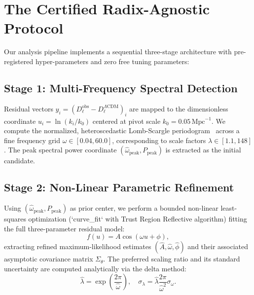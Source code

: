 \section{The Certified Radix-Agnostic Protocol}
Our analysis pipeline implements a sequential three-stage architecture with pre-registered hyper-parameters and zero free tuning parameters:

\subsection{Stage 1: Multi-Frequency Spectral Detection}
Residual vectors $y_i = (D_\ell^{\mathrm{obs}} - D_\ell^{\Lambda\mathrm{CDM}})_i$ are mapped to the dimensionless coordinate $u_i = \ln(k_i / k_0)$ centered at pivot scale $k_0 = 0.05\,\mathrm{Mpc}^{-1}$. We compute the normalized, heteroscedastic Lomb-Scargle periodogram~\cite{lomb1976,scargle1982,zechmeister2009} across a fine frequency grid $\omega \in [0.04, 60.0]$, corresponding to scale factors $\lambda \in [1.1, 148]$. The peak spectral power coordinate $(\hat\omega_{\mathrm{peak}}, P_{\mathrm{peak}})$ is extracted as the initial candidate.

\subsection{Stage 2: Non-Linear Parametric Refinement}
Using $(\hat\omega_{\mathrm{peak}}, P_{\mathrm{peak}})$ as prior center, we perform a bounded non-linear least-squares optimization (`curve\_fit` with Trust Region Reflective algorithm) fitting the full three-parameter residual model:
\begin{equation}
f(u) = A \cos(\omega u + \phi),
\end{equation}
extracting refined maximum-likelihood estimates $(\hat A, \hat\omega, \hat\phi)$ and their associated asymptotic covariance matrix $\Sigma_{\theta}$. The preferred scaling ratio and its standard uncertainty are computed analytically via the delta method:
\begin{equation}
\hat\lambda = \exp\left( \frac{2\pi}{\hat\omega} \right), \quad \sigma_\lambda = \hat\lambda \frac{2\pi}{\hat\omega^2} \sigma_\omega.
\end{equation}

